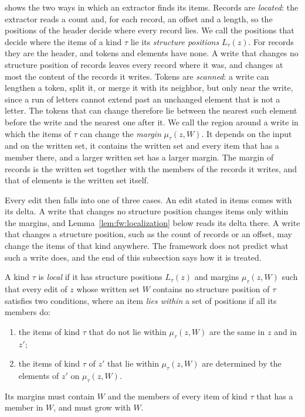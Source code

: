  shows the two ways in which an extractor finds its items. Records are \emph{located}: the
extractor reads a count and, for each record, an offset and a length, so the positions of the header decide where every
record lies. We call the positions that decide where the items of a kind $\tau$ lie its \emph{structure positions}
$L_\tau(z)$. For records they are the header, and tokens and elements have none. A write that changes no structure
position of records leaves every record where it was, and changes at most the content of the records it writes. Tokens
are \emph{scanned}: a write can lengthen a token, split it, or merge it with its neighbor, but only near the write,
since a run of letters cannot extend past an unchanged element that is not a letter. The tokens that can change
therefore lie between the nearest such element before the write and the nearest one after it. We call the region
around a write in which the items of $\tau$ can change the \emph{margin} $\mu_\tau(z, W)$. It depends on the input and
on the written set, it contains the written set and every item that has a member there, and a larger written set has a
larger margin. The margin of records is the written set together with the members of the records it writes, and that
of elements is the written set itself.

Every edit then falls into one of three cases. An edit stated in items comes with its delta. A write that changes no
structure position changes items only within the margins, and Lemma~\ref{lem:fw:localization} below reads its delta
there. A write that changes a structure position, such as the count of records or an offset, may change the items of
that kind anywhere. The framework does not predict what such a write does, and the end of this subsection says how it
is treated.

\label{def:fw:local}
{
A kind $\tau$ is \emph{local} if it has structure positions $L_\tau(z)$ and margins $\mu_\tau(z, W)$ such that every
edit of $z$ whose written set $W$ contains no structure position of $\tau$ satisfies two conditions, where an item
\emph{lies within} a set of positions if all its members do:
\begin{enumerate}[label=(\roman*), leftmargin=*, nosep]
  \item the items of kind $\tau$ that do not lie within $\mu_\tau(z, W)$ are the same in $z$ and in $z'$;
  \item the items of kind $\tau$ of $z'$ that lie within $\mu_\tau(z, W)$ are determined by the elements of $z'$ on
    $\mu_\tau(z, W)$.
\end{enumerate}
Its margins must contain $W$ and the members of every item of kind $\tau$ that has a member in $W$, and must grow with
$W$.
}

